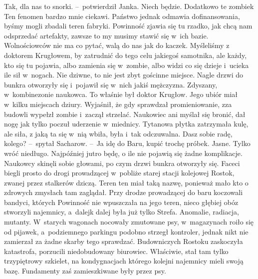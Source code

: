 \documentclass[../MAIN.tex]{subfiles}
\begin{document}
\xx Tak, dla nas to snorki. --~potwierdził Janka.
\xx Niech będzie. Dodatkowo te zombie\3k Ten fenomen bardzo mnie ciekawi. Państwo jednak odmawia dofinansowania, byśmy mogli zbadali teren fabryki. Powinność zjawia się tu rzadko, jak chcą nam odsprzedać artefakty, zawsze to my musimy stawić się w~ich bazie. Wolnościowców nie ma co pytać, walą do nas jak do kaczek. Myśleliśmy z doktorem Krugłowem, by zatrudnić do tego celu jakiegoś samotnika, ale każdy, kto się tu pojawia, albo zamienia się w~zombie, albo widzi co się dzieje i~ucieka ile sił w~nogach.
\xx Nie dziwne, to nie jest zbyt gościnne miejsce.
\qd
\hspace{21.4em}Nagle drzwi do bunkra otworzyły się i~pojawił się w~nich jakiś mężczyzna. Zdyszany, w~kombinezonie naukowca. To właśnie był doktor Krugłow. Jego ubiór miał w~kilku miejscach dziury. Wyjaśnił, że gdy sprawdzał promieniowanie, zza budowli wypełzł zombie i~zaczął strzelać. Naukowiec ani myślał się bronić, dał nogę jak tylko poczuł uderzenie w~miednicy. Tytanowa płytka zatrzymała kulę, ale siła, z jaką ta się w~nią wbiła, była i~tak odczuwalna.
\sx Dasz sobie radę, kolego? --~spytał Sacharow. --~Ja idę do Baru, kupić trochę próbek.
\xx Jasne. Tylko wróć niedługo.
\xx Najpóźniej jutro będę, o ile nie pojawią się żadne komplikacje.
\qd
\hspace{28.5em}Naukowcy skinęli sobie głowami, po czym drzwi bunkra otworzyły się. Faceci biegli prosto do drogi prowadzącej w~pobliże starej stacji kolejowej Rostok, zwanej przez stalkerów dziczą. Teren ten miał taką nazwę, ponieważ mało kto o zdrowych zmysłach tam zaglądał. Przy drodze prowadzącej do baru koczowali bandyci, których Powinność nie wpuszczała na jego teren, nieco głębiej obóz stworzyli najemnicy, a~dalej\3k dalej była już tylko Strefa. Anomalie, radiacja, mutanty. W~starych wagonach nocowały zmutowane psy, w~magazynach roiło się od pijawek, a~podziemnego parkingu podobno strzegł kontroler, jednak nikt nie zamierzał za żadne skarby tego sprawdzać. Budowniczych Rostoku zaskoczyła katastrofa, porzucili niedobudowany biurowiec. Właściwie, stał tam tylko trzypiętrowy szkielet, na kondygnacjach którego kolejni najemnicy mieli swoją bazę. Fundamenty zaś zamieszkiwane były przez psy.
\end{document}
